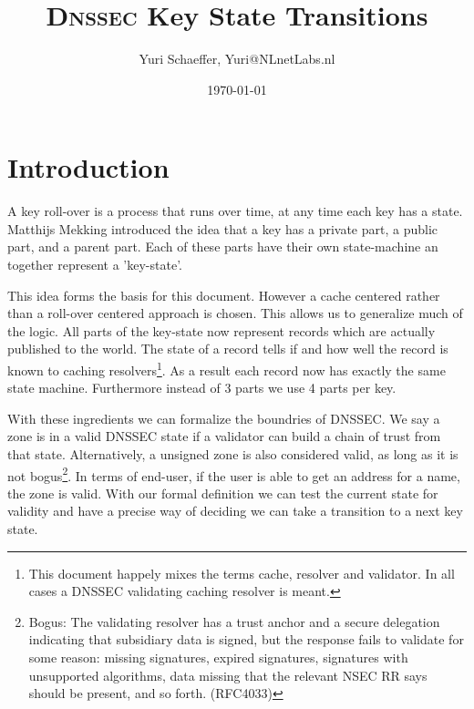 \documentclass[twoside, a4paper]{article}
\title{\textsc{Dnssec} Key State Transitions}
\author{Yuri Schaeffer, Yuri@NLnetLabs.nl}
\date{\today}
\begin{document}
\maketitle


\section{Introduction}

A key roll-over is a process that runs over time, at any time each 
key has a state. Matthijs Mekking introduced the idea that a key has 
a private part, a public part, and a parent part. Each of these 
parts have their own state-machine an together represent a 
'key-state'.

This idea forms the basis for this document. However a cache 
centered rather than a roll-over centered approach is chosen. This 
allows us to generalize much of the logic. All parts of the 
key-state now represent records which are actually published to the 
world. The state of a record tells if and how well the record is 
known to caching resolvers\footnote{ This document happely mixes the 
terms cache, resolver and validator. In all cases a DNSSEC 
validating caching resolver is meant.}. As a result each record now 
has exactly the same state machine. Furthermore instead of 3 parts 
we use 4 parts per key.

With these ingredients we can formalize the boundries of DNSSEC. We say 
a zone is in a valid DNSSEC state if a validator can build a chain of 
trust from that state. Alternatively, a unsigned zone is also considered
valid, as long as it is not bogus\footnote{Bogus: 
		The validating resolver has a trust anchor and a secure
	  delegation indicating that subsidiary data is signed, but the 
	  response fails to validate for some reason: missing 
	  signatures, expired signatures, signatures with unsupported 
	  algorithms, data missing that the relevant NSEC RR says should 
	  be present, and so forth. (RFC4033) }. In terms of end-user, 
	  if the user is able to get an address for
a name, the zone is valid. With our formal definition we can test the
current state for validity and have a precise way of deciding we can
take a transition to a next key state.
\end{document}
